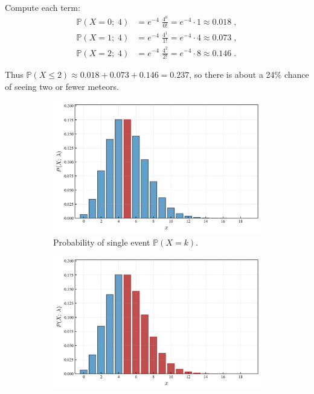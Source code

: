\documentclass{book}
\begin{document}
Compute each term:
\begin{align}
	\mathbb{P}(X = 0; \; 4) &= e^{-4} \; \frac{4^0}{0!} = e^{-4} \cdot 1 \approx 0.018 \; , \nonumber \\
	\mathbb{P}(X = 1; \; 4) &= e^{-4} \; \frac{4^1}{1!} = e^{-4} \cdot 4 \approx 0.073 \; , \nonumber \\
	\mathbb{P}(X = 2; \; 4) &= e^{-4} \; \frac{4^2}{2!} = e^{-4} \cdot 8 \approx 0.146 \; . \nonumber
\end{align}

Thus $\mathbb{P}(X \leq 2) \approx 0.018 + 0.073 + 0.146 = 0.237$, so there is about a 24\% chance of seeing two or fewer meteors.

\begin{figure}[ht]
    \centering
    \begin{subfigure}[b]{0.48\textwidth}
        \centering
        \includegraphics[width=\textwidth, height=0.7\textwidth]{figures/chapter2/poisson_1.png}
        \caption{Probability of single event $\mathbb{P} (X = k)$.}
        \label{fig:poisson1}
    \end{subfigure}
    \hfill
    \begin{subfigure}[b]{0.48\textwidth}
        \centering
        \includegraphics[width=\textwidth, height=0.7\textwidth]{figures/chapter2/poisson_1_cum.png}

\end{subfigure}
\end{figure}
\end{document}
